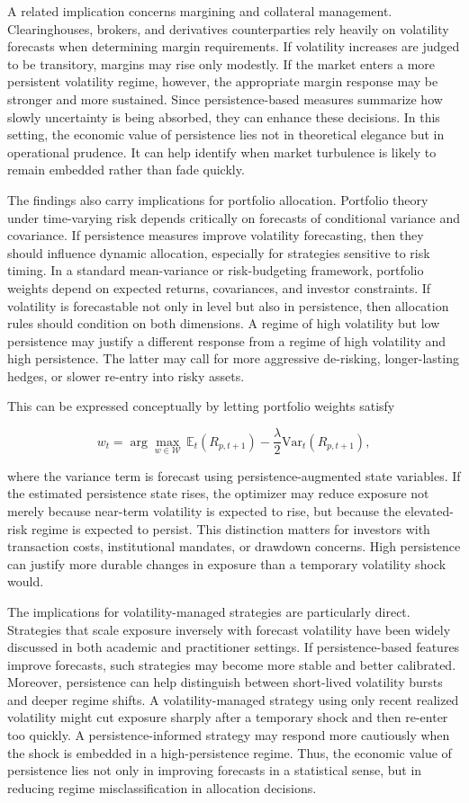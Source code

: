 \documentclass[12pt]{article}
\begin{document}
A related implication concerns margining and collateral management. Clearinghouses, brokers, and derivatives counterparties rely heavily on volatility forecasts when determining margin requirements. If volatility increases are judged to be transitory, margins may rise only modestly. If the market enters a more persistent volatility regime, however, the appropriate margin response may be stronger and more sustained. Since persistence-based measures summarize how slowly uncertainty is being absorbed, they can enhance these decisions. In this setting, the economic value of persistence lies not in theoretical elegance but in operational prudence. It can help identify when market turbulence is likely to remain embedded rather than fade quickly.

The findings also carry implications for portfolio allocation. Portfolio theory under time-varying risk depends critically on forecasts of conditional variance and covariance. If persistence measures improve volatility forecasting, then they should influence dynamic allocation, especially for strategies sensitive to risk timing. In a standard mean-variance or risk-budgeting framework, portfolio weights depend on expected returns, covariances, and investor constraints. If volatility is forecastable not only in level but also in persistence, then allocation rules should condition on both dimensions. A regime of high volatility but low persistence may justify a different response from a regime of high volatility and high persistence. The latter may call for more aggressive de-risking, longer-lasting hedges, or slower re-entry into risky assets.

This can be expressed conceptually by letting portfolio weights satisfy

\[w_t = \arg\max_{w \in \mathcal{W}}\, \mathbb{E}_t(R_{p,t+1}) - \frac{\lambda}{2}\mathrm{Var}_t(R_{p,t+1}),\]

where the variance term is forecast using persistence-augmented state variables. If the estimated persistence state rises, the optimizer may reduce exposure not merely because near-term volatility is expected to rise, but because the elevated-risk regime is expected to persist. This distinction matters for investors with transaction costs, institutional mandates, or drawdown concerns. High persistence can justify more durable changes in exposure than a temporary volatility shock would.

The implications for volatility-managed strategies are particularly direct. Strategies that scale exposure inversely with forecast volatility have been widely discussed in both academic and practitioner settings. If persistence-based features improve forecasts, such strategies may become more stable and better calibrated. Moreover, persistence can help distinguish between short-lived volatility bursts and deeper regime shifts. A volatility-managed strategy using only recent realized volatility might cut exposure sharply after a temporary shock and then re-enter too quickly. A persistence-informed strategy may respond more cautiously when the shock is embedded in a high-persistence regime. Thus, the economic value of persistence lies not only in improving forecasts in a statistical sense, but in reducing regime misclassification in allocation decisions.
\end{document}
